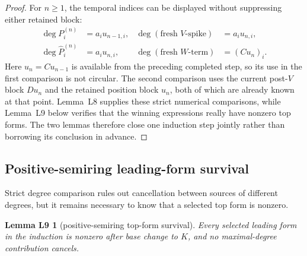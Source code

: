 \documentclass[11pt,letterpaper]{article}
\theoremstyle{plain}
\newtheorem*{lemLnine}{Lemma L9}
\begin{document}
\begin{proof}
For \(n\geq1\), the temporal indices can be displayed without suppressing either retained block:
\[
\begin{aligned}
\deg P_i^{(n)}&=a_i u_{n-1,i},
&\deg(\text{fresh }V\text{-spike})&=a_i u_{n,i},\\
\deg\widehat P_i^{(n)}&=a_i u_{n,i},
&\deg(\text{fresh }W\text{-term})&=(Cu_n)_i.
\end{aligned}
\]
Here \(u_n=Cu_{n-1}\) is available from the preceding completed step, so its use in the first comparison is not circular.  The second comparison uses the current post-\(V\) block \(Du_n\) and the retained position block \(u_n\), both of which are already known at that point.  Lemma~L8 supplies these strict numerical comparisons, while Lemma~L9 below verifies that the winning expressions really have nonzero top forms.  The two lemmas therefore close one induction step jointly rather than borrowing its conclusion in advance.
\end{proof}

\subsection{Positive-semiring leading-form survival}

Strict degree comparison rules out cancellation between sources of different degrees, but it remains necessary to know that a selected top form is nonzero.

\begin{lemLnine}[positive-semiring top-form survival]
Every selected leading form in the induction is nonzero after base change to $K$, and no maximal-degree contribution cancels.
\end{lemLnine}
\end{document}
